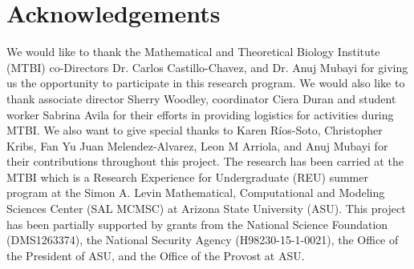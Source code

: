 \documentclass[a4paper]{article}
\begin{document}

\section{Acknowledgements}

We would like to thank the Mathematical and Theoretical Biology Institute (MTBI) co-Directors Dr. Carlos Castillo-Chavez, and Dr. Anuj Mubayi for giving us the opportunity to participate in this research program. We would also like to thank associate director Sherry Woodley, coordinator Ciera Duran and student worker Sabrina Avila for their efforts in providing logistics for activities during MTBI. We also want to give special thanks to Karen Ríos-Soto,
Christopher Kribs, Fan Yu
Juan Melendez-Alvarez, Leon M Arriola, and Anuj Mubayi for their contributions throughout this project. The research has been carried at the MTBI which is a Research Experience for Undergraduate (REU) summer program at the Simon A. Levin Mathematical, Computational and Modeling Sciences Center (SAL MCMSC) at Arizona State University (ASU). This project has been partially supported by grants from the National Science Foundation (DMS1263374), the National Security Agency (H98230-15-1-0021), the Office of the President of ASU, and the Office of the Provost at ASU.
\end{document}
